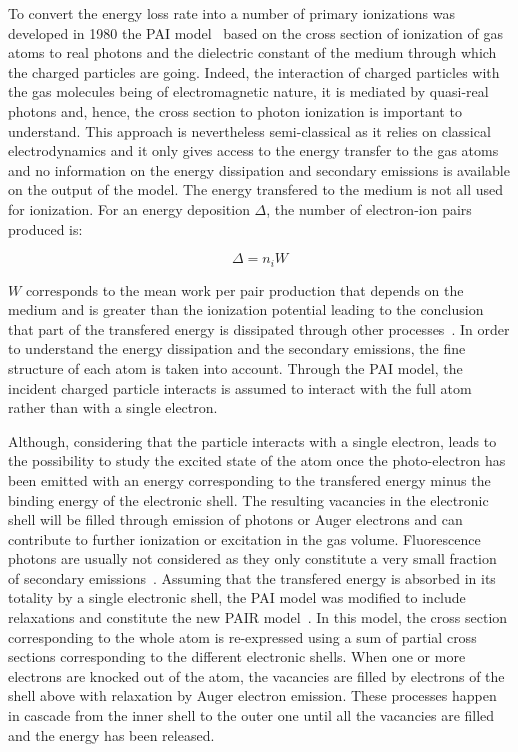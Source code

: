 	To convert the energy loss rate into a number of primary ionizations was developed in 1980 the \acf{PAI} model~\cite{ALLISON1980} based on the cross section of ionization of gas atoms to real photons and the dielectric constant of the medium through which the charged particles are going. Indeed, the interaction of charged particles with the gas molecules being of electromagnetic nature, it is mediated by quasi-real photons and, hence, the cross section to photon ionization is important to understand. This approach is nevertheless semi-classical as it relies on classical electrodynamics and it only gives access to the energy transfer to the gas atoms and no information on the energy dissipation and secondary emissions is available on the output of the model. The energy transfered to the medium is not all used for ionization. For an energy deposition $\Delta$, the number of electron-ion pairs produced is:
	
	\begin{equation}
	\label{eq:npairs}
	\Delta = n_iW
	\end{equation}
	
	$W$ corresponds to the mean work per pair production that depends on the medium and is greater than the ionization potential leading to the conclusion that part of the transfered energy is dissipated through other processes~\cite{VINCENT2017,ICRU31}. In order to understand the energy dissipation and the secondary emissions, the fine structure of each atom is taken into account. Through the PAI model, the incident charged particle interacts is assumed to interact with the full atom rather than with a single electron.
	
	Although, considering that the particle interacts with a single electron, leads to the possibility to study the excited state of the atom once the photo-electron has been emitted with an energy corresponding to the transfered energy minus the binding energy of the electronic shell. The resulting vacancies in the electronic shell will be filled through emission of photons or Auger electrons and can contribute to further ionization or excitation in the gas volume. Fluorescence photons are usually not considered as they only constitute a very small fraction of secondary emissions~\cite{SMIRNOV2005}. Assuming that the transfered energy is absorbed in its totality by a single electronic shell, the PAI model was modified to include relaxations and constitute the new \acf{PAIR} model~\cite{SMIRNOV2005}. In this model, the cross section corresponding to the whole atom is re-expressed using a sum of partial cross sections corresponding to the different electronic shells. When one or more electrons are knocked out of the atom, the vacancies are filled by electrons of the shell above with relaxation by Auger electron emission. These processes happen in cascade from the inner shell to the outer one until all the vacancies are filled and the energy has been released.
	

